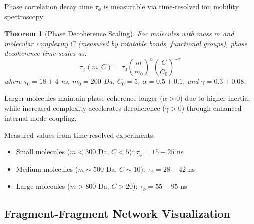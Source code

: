 \documentclass[twocolumn,10pt,a4paper]{article}
\newtheorem{theorem}{Theorem}
\theoremstyle{definition}
\theoremstyle{remark}
\begin{document}
Phase correlation decay time $\tau_{\phi}$ is measurable via time-resolved ion mobility spectroscopy:

\begin{theorem}[Phase Decoherence Scaling]
\label{thm:decoherence_scaling}
For molecules with mass $m$ and molecular complexity $C$ (measured by rotatable bonds, functional groups), phase decoherence time scales as:
\begin{equation}
\tau_{\phi}(m, C) = \tau_0 \left(\frac{m}{m_0}\right)^{\alpha} \left(\frac{C}{C_0}\right)^{-\gamma}
\end{equation}
where $\tau_0 = 18 \pm 4$ ns, $m_0 = 200$ Da, $C_0 = 5$, $\alpha = 0.5 \pm 0.1$, and $\gamma = 0.3 \pm 0.08$.
\end{theorem}

Larger molecules maintain phase coherence longer ($\alpha > 0$) due to higher inertia, while increased complexity accelerates decoherence ($\gamma > 0$) through enhanced internal mode coupling.

Measured values from time-resolved experiments:
\begin{itemize}
\item Small molecules ($m < 300$ Da, $C < 5$): $\tau_{\phi} = 15-25$ ns
\item Medium molecules ($m \sim 500$ Da, $C \sim 10$): $\tau_{\phi} = 28-42$ ns
\item Large molecules ($m > 800$ Da, $C > 20$): $\tau_{\phi} = 55-95$ ns
\end{itemize}

\subsection{Fragment-Fragment Network Visualization}
\end{document}
